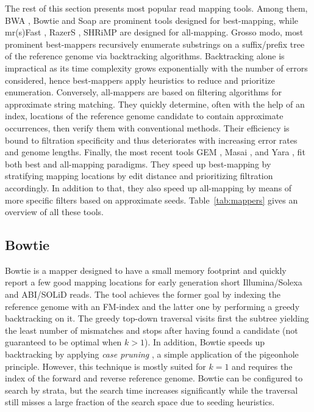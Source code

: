 The rest of this section presents most popular read mapping tools.
Among them, BWA \citep{Li2009,Li2010a}, Bowtie \citep{Langmead2009,Langmead2012} and Soap \citep{Li2009b} are prominent tools designed for best-mapping, while mr(s)Fast \citep{Alkan2009,Hach2010}, RazerS \citep{Weese2009,Weese2012}, SHRiMP \citep{Rumble2009,David2011} are designed for all-mapping.
Grosso modo, most prominent best-mappers recursively enumerate substrings on a suffix/prefix tree of the reference genome via backtracking algorithms.
Backtracking alone is impractical as its time complexity grows exponentially with the number of errors considered, hence best-mappers apply heuristics to reduce and prioritize enumeration.
Conversely, all-mappers are based on filtering algorithms for approximate string matching.
They quickly determine, often with the help of an index, locations of the reference genome candidate to contain approximate occurrences, then verify them with conventional methods.
Their efficiency is bound to filtration specificity and thus deteriorates with increasing error rates and genome lengths.
Finally, the most recent tools GEM \citep{MarcoSola2012}, Masai \citep{Siragusa2013}, and Yara \citep{Siragusa2014}, fit both best and all-mapping paradigms.
They speed up best-mapping by stratifying mapping locations by edit distance and prioritizing filtration accordingly.
In addition to that, they also speed up all-mapping by means of more specific filters based on approximate seeds.
Table~\ref{tab:mappers} gives an overview of all these tools.


\subsection{Bowtie}
\label{background:mappers:bowtie}

Bowtie \citep{Langmead2009} is a mapper designed to have a small memory footprint and quickly report a few good mapping locations for early generation short Illumina/Solexa and ABI/SOLiD reads.
The tool achieves the former goal by indexing the reference genome with an FM-index and the latter one by performing a greedy backtracking on it.
The greedy top-down traversal visits first the subtree yielding the least number of mismatches and stops after having found a candidate (not guaranteed to be optimal when $k>1$).
In addition, Bowtie speeds up backtracking by applying \emph{case pruning} \citep{Maekinen2010}, a simple application of the pigeonhole principle.
However, this technique is mostly suited for $k=1$ and requires the index of the forward and reverse reference genome.
Bowtie can be configured to search by strata, but the search time increases significantly while the traversal still misses a large fraction of the search space due to seeding heuristics.

